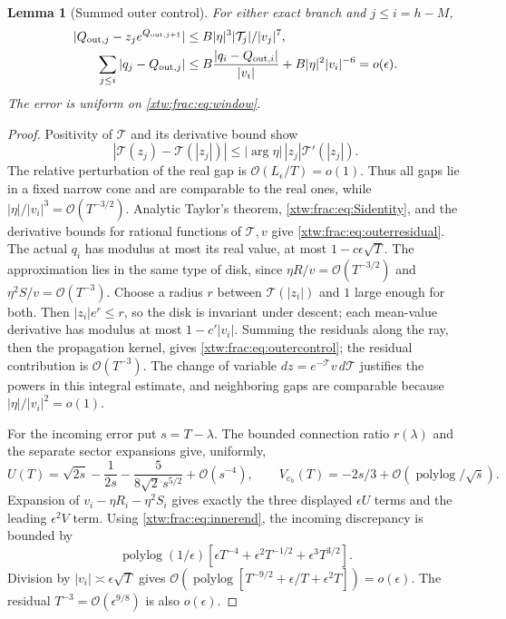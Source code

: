 \documentclass[11pt]{article}
\newtheorem{lemma}[theorem]{Lemma}
\theoremstyle{remark}\newtheorem{remark}[theorem]{Remark}
\newcommand{\OO}{\mathcal O}
\newcommand{\TT}{\mathcal T}
\begin{document}
\begin{lemma}[Summed outer control]\label{xtw:frac:lem:outer}
For either exact branch and $j\le i=h-M$,
\begin{align}
 |Q_{{\rm out},j}-z_je^{Q_{{\rm out},j+1}}|
     &\le B|\eta|^3|\TT_j|/|v_j|^7,\label{xtw:frac:eq:outerresidual}\\
 \sum_{j\le i}|q_j-Q_{{\rm out},j}|
     &\le B\frac{|q_i-Q_{{\rm out},i}|}{|v_i|}
                 +B|\eta|^2|v_i|^{-6}=o(\epsilon).
                                                        \label{xtw:frac:eq:outercontrol}
\end{align}
The error is uniform on \eqref{xtw:frac:eq:window}.
\end{lemma}
\begin{proof}
Positivity of $\TT$ and its derivative bound show
\[
 |\TT(z_j)-\TT(|z_j|)|
       \le |\arg\eta|\,|z_j|\TT'(|z_j|).
\]
The relative perturbation of the real gap is $\OO(L_\epsilon/T)=o(1)$.
Thus all gaps lie in a fixed narrow cone and are comparable to the real
ones, while $|\eta|/|v_i|^3=\OO(T^{-3/2})$.
Analytic Taylor's theorem, \eqref{xtw:frac:eq:Sidentity}, and the derivative bounds
for rational functions of $\TT,v$ give \eqref{xtw:frac:eq:outerresidual}.
The actual $q_i$ has modulus at most its real value, at most
$1-c\epsilon\sqrt T$. The approximation lies in the same type of disk,
since $\eta R/v=\OO(T^{-3/2})$ and $\eta^2S/v=\OO(T^{-3})$.
Choose a radius $r$ between $\TT(|z_i|)$ and $1$ large enough for both.
Then $|z_i|e^r\le r$, so the disk is invariant under descent; each
mean-value derivative has modulus at most $1-c'|v_i|$.
Summing the residuals along the ray, then the propagation kernel, gives
\eqref{xtw:frac:eq:outercontrol}; the residual contribution is $\OO(T^{-3})$.
The change of variable $dz=e^{-\TT}v\,d\TT$ justifies the powers in this
integral estimate, and neighboring gaps are comparable because
$|\eta|/|v_i|^2=o(1)$.

For the incoming error put $s=T-\lambda$. The bounded connection ratio
$r(\lambda)$ and the separate sector expansions give, uniformly,
\begin{equation}\label{xtw:frac:eq:Ularge}
 U(T)=\sqrt{2s}-\frac1{2s}-\frac5{8\sqrt2\,s^{5/2}}+\OO(s^{-4}),\qquad
 V_{c_h}(T)=-2s/3+\OO(\operatorname{polylog}/\sqrt s).
\end{equation}
Expansion of $v_i-\eta R_i-\eta^2S_i$ gives exactly the three displayed
$\epsilon U$ terms and the leading $\epsilon^2V$ term.
Using \eqref{xtw:frac:eq:innerend}, the incoming discrepancy is bounded by
\[
 \operatorname{polylog}(1/\epsilon)
 [\epsilon T^{-4}+\epsilon^2T^{-1/2}+\epsilon^3T^{3/2}].
\]
Division by $|v_i|\asymp\epsilon\sqrt T$ gives
$\OO(\operatorname{polylog}[T^{-9/2}+\epsilon/T+\epsilon^2T])=o(\epsilon)$.
The residual $T^{-3}=\OO(\epsilon^{9/8})$ is also $o(\epsilon)$.
\end{proof}
\end{document}
